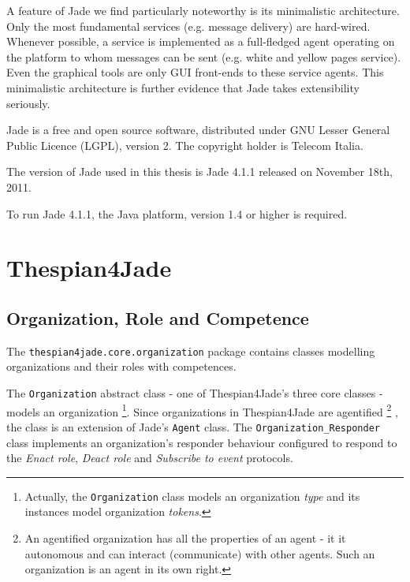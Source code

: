 A feature of Jade we find particularly noteworthy is its minimalistic architecture.
Only the most fundamental services (e.g. message delivery) are hard-wired.
Whenever possible, a service is implemented as a full-fledged agent operating on the platform to whom messages can be sent (e.g. white and yellow pages service).
Even the graphical tools are only GUI front-ends to these service agents.
This minimalistic architecture is further evidence that Jade takes extensibility seriously.

Jade is a free and open source software, distributed under GNU Lesser General Public Licence (LGPL), version 2.
The copyright holder is Telecom Italia.

The version of Jade used in this thesis is Jade 4.1.1 released on November 18th, 2011.

To run Jade 4.1.1, the Java platform, version 1.4 or higher is required.

\section{Thespian4Jade}

\subsection{Organization, Role and Competence}

The \texttt{thespian4jade.core.organization} package contains classes modelling organizations and their roles with competences.

The \texttt{Organization} abstract class - one of Thespian4Jade's three core classes - models an organization
\footnote{Actually, the \texttt{Organization} class models an organization \textit{type} and its instances model organization \textit{tokens}.}.
Since organizations in Thespian4Jade are agentified
\footnote{An agentified organization has all the properties of an agent - it it autonomous and can interact (communicate) with other agents. Such an organization is an agent in its own right.}
, the class is an extension of Jade's \texttt{Agent} class.
The \texttt{Organization\_Responder} class implements an organization's responder behaviour configured to respond to the \textit{Enact role}, \textit{Deact role} and \textit{Subscribe to event} protocols.

